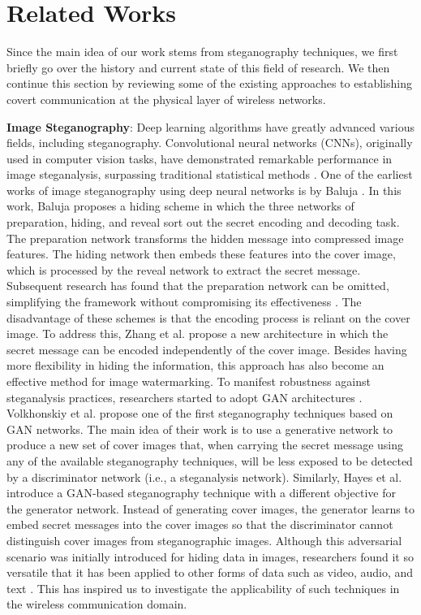 \section{Related Works}
\label{s:related}
Since the main idea of our work stems from steganography techniques, we first briefly go over the history and current state of this field of research. We then continue this section by reviewing some of the existing approaches to establishing covert communication at the physical layer of wireless networks.

\textbf{Image Steganography}: Deep learning algorithms have greatly advanced various fields, including steganography. Convolutional neural networks (CNNs), originally used in computer vision tasks, have demonstrated remarkable performance in image steganalysis, surpassing traditional statistical methods \cite{tan2014stacked, qian2015deep, xu2016structural}. One of the earliest works of image steganography using deep neural networks is by Baluja \cite{baluja2017hiding}. In this work, Baluja proposes a hiding scheme in which the three networks of preparation, hiding, and reveal sort out the secret encoding and decoding task. The preparation network transforms the hidden message into compressed image features. The hiding network then embeds these features into the cover image, which is processed by the reveal network to extract the secret message. Subsequent research has found that the preparation network can be omitted, simplifying the framework without compromising its effectiveness \cite{zhang2021brief}. The disadvantage of these schemes is that the encoding process is reliant on the cover image. To address this, Zhang et al. \cite{zhang2020udh} propose a new architecture in which the secret message can be encoded independently of the cover image. Besides having more flexibility in hiding the information, this approach has also become an effective method for image watermarking. To manifest robustness against steganalysis practices, researchers started to adopt GAN architectures \cite{goodfellow2014generative}. Volkhonskiy et al. \cite{volkhonskiy2020steganographic} propose one of the first steganography techniques based on GAN networks. The main idea of their work is to use a generative network to produce a new set of cover images that, when carrying the secret message using any of the available steganography techniques, will be less exposed to be detected by a discriminator network (i.e., a steganalysis network). Similarly, Hayes et al. \cite{hayes2017generating} introduce a GAN-based steganography technique with a different objective for the generator network. Instead of generating cover images, the generator learns to embed secret messages into the cover images so that the discriminator cannot distinguish cover images from steganographic images. Although this adversarial scenario was initially introduced for hiding data in images, researchers found it so versatile that it has been applied to other forms of data such as video, audio, and text \cite{martin2023evolving}. This has inspired us to investigate the applicability of such techniques in the wireless communication domain.


